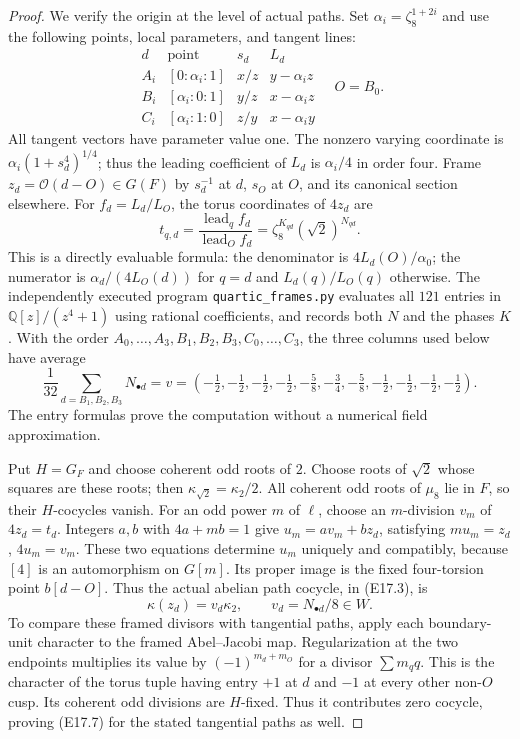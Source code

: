 \begin{proof}
We verify the origin at the level of actual paths.
Set $\alpha_i=\zeta_8^{1+2i}$ and use the following
points, local parameters, and tangent lines:
\[
 \begin{array}{c|c|c|c}
 d&\text{point}&s_d&L_d\\\hline
 A_i&[0:\alpha_i:1]&x/z&y-\alpha_i z\\
 B_i&[\alpha_i:0:1]&y/z&x-\alpha_i z\\
 C_i&[\alpha_i:1:0]&z/y&x-\alpha_i y
 \end{array}
 \quad O=B_0 .
 \tag{E17.4}
\]
All tangent vectors have parameter value one. The
nonzero varying coordinate is
$\alpha_i(1+s_d^4)^{1/4}$; thus the leading coefficient
of $L_d$ is $\alpha_i/4$ in order four. Frame
$z_d=\mathcal O(d-O)\in G(F)$ by $s_d^{-1}$ at $d$,
$s_O$ at $O$, and its canonical section elsewhere.
For $f_d=L_d/L_O$, the torus coordinates of $4z_d$ are
\[
 t_{q,d}=
 \frac{\operatorname{lead}_q f_d}{
       \operatorname{lead}_O f_d}
       =\zeta_8^{K_{qd}}(\sqrt2)^{N_{qd}}.
 \tag{E17.5}
\]
This is a directly evaluable formula: the denominator
is $4L_d(O)/\alpha_0$; the numerator is
$\alpha_d/(4L_O(d))$ for $q=d$ and $L_d(q)/L_O(q)$
otherwise. The independently executed program
\texttt{quartic\_frames.py} evaluates all $121$ entries
in $\mathbb Q[z]/(z^4+1)$ using rational coefficients,
and records both $N$ and the phases $K$. With the order
$A_0,\ldots,A_3,B_1,B_2,B_3,C_0,\ldots,C_3$,
the three columns used below have average
\[
 \frac1{32}\sum_{d=B_1,B_2,B_3}N_{\bullet d}
 =v=\left(-\tfrac12,-\tfrac12,-\tfrac12,-\tfrac12,
 -\tfrac58,-\tfrac34,-\tfrac58,
 -\tfrac12,-\tfrac12,-\tfrac12,-\tfrac12\right).
 \tag{E17.6}
\]
The entry formulas prove the computation without a
numerical field approximation.

Put $H=G_F$ and choose coherent odd roots of $2$.
Choose roots of $\sqrt2$ whose squares are these roots;
then $\kappa_{\sqrt2}=\kappa_2/2$. All coherent odd
roots of $\mu_8$ lie in $F$, so their $H$-cocycles
vanish. For an odd power $m$ of $\ell$, choose an
$m$-division $v_m$ of $4z_d=t_d$. Integers $a,b$ with
$4a+mb=1$ give $u_m=a v_m+bz_d$, satisfying
$mu_m=z_d$, $4u_m=v_m$. These two equations determine
$u_m$ uniquely and compatibly, because $[4]$ is an
automorphism on $G[m]$. Its proper image is the fixed
four-torsion point $b[d-O]$. Thus the actual abelian
path cocycle, in (E17.3), is
\[
  \kappa(z_d)=v_d\kappa_2,
       \qquad v_d=N_{\bullet d}/8\in W .
 \tag{E17.7}
\]
To compare these framed divisors with tangential
paths, apply each boundary-unit character to the
framed Abel--Jacobi map. Regularization at the two
endpoints multiplies its value by
$(-1)^{m_d+m_O}$ for a divisor $\sum m_q q$.
This is the character of the torus tuple having
entry $+1$ at $d$ and $-1$ at every other non-$O$
cusp. Its coherent odd divisions are $H$-fixed.
Thus it contributes zero cocycle, proving (E17.7)
for the stated tangential paths as well.


\end{proof}
